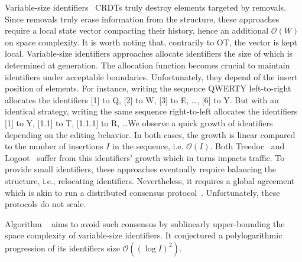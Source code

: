\begin{asparadesc}
\item [Variable-size identifiers~\cite{nedelec2013lseq, preguica2009commutative,
    weiss2009logoot}] CRDTs truly destroy elements targeted by removals.  Since
  removals truly erase information from the structure, these approaches require
  a local state vector compacting their history, hence an additional
  $\mathcal{O}(W)$ on space complexity. It is worth noting that, contrarily to
  OT, the vector is kept local. Variable-size identifiers approaches allocate
  identifiers the size of which is determined at generation. The allocation
  function becomes crucial to maintain identifiers under acceptable
  boundaries. Unfortunately, they depend of the insert position of elements. For
  instance, writing the sequence QWERTY left-to-right allocates the identifiers
  [1] to Q, [2] to W, [3] to E, \ldots, [6] to Y. But with an identical
  strategy, writing the same sequence right-to-left allocates the identifiers
  [1] to Y, [1.1] to T, [1.1.1] to R, \ldots We observe a quick growth of
  identifiers depending on the editing behavior. In both cases, the growth is
  linear compared to the number of insertions $I$ in the sequence,
  i.e. $\mathcal{O}(I)$. Both Treedoc~\cite{preguica2009commutative} and
  Logoot~\cite{weiss2009logoot, weiss2010logootundo} suffer from this
  identifiers' growth which in turns impacts traffic.
  To provide small identifiers, these approaches eventually require balancing
  the structure, i.e., relocating identifiers. Nevertheless, it requires a
  global agreement which is akin to run a distributed consensus
  protocol~\cite{zawirski2011asynchronous}. Unfortunately, these protocols do
  not scale.

  Algorithm \LSEQ~\cite{nedelec2013lseq} aims to avoid such consensus by
  sublinearly upper-bounding the space complexity of variable-size
  identifiers. It conjectured a polylogarithmic progression of its identifiers
  size $\mathcal{O}((\log I)^2)$.

\end{asparadesc}

